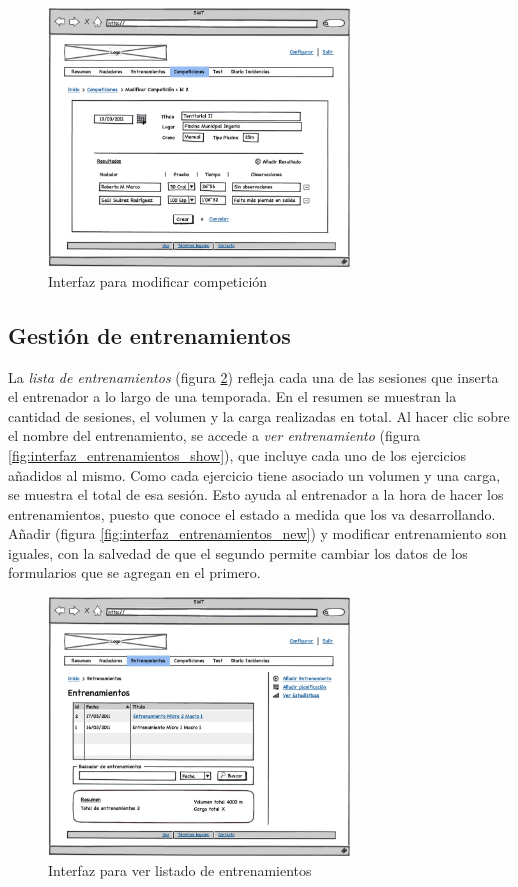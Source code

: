		\begin{figure}[H]
		  \centering
		    \includegraphics[width=8cm]{./eps/17_Competiciones_modif.eps}
		  \caption{Interfaz para modificar competición}
		  \label{fig:interfaz_competiciones_modif}
		\end{figure}
	
	\subsection{Gestión de entrenamientos} %
		\label{sub:gestion_de_entrenamientos}
	
	La {\it lista de entrenamientos} (figura \ref{fig:interfaz_entrenamientos}) refleja cada una de las sesiones que inserta el entrenador a lo largo de una temporada. En el resumen se muestran la cantidad de sesiones, el volumen y la carga realizadas en total. Al hacer clic sobre el nombre del entrenamiento, se accede a {\it ver entrenamiento} (figura \ref{fig:interfaz_entrenamientos_show}), que incluye cada uno de los ejercicios añadidos al mismo. Como cada ejercicio tiene asociado un volumen y una carga, se muestra el total de esa sesión. Esto ayuda al entrenador a la hora de hacer los entrenamientos, puesto que conoce el estado a medida que los va desarrollando.
	Añadir (figura \ref{fig:interfaz_entrenamientos_new}) y modificar entrenamiento son iguales, con la salvedad de que el segundo permite cambiar los datos de los formularios que se agregan en el primero.
	
	\begin{figure}[H]
	  \centering
	    \includegraphics[width=8cm]{./eps/18_Entrenamientos.eps}
	  \caption{Interfaz para ver listado de entrenamientos}
	  \label{fig:interfaz_entrenamientos}
	\end{figure}

